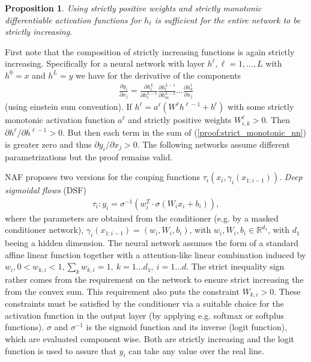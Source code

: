 \documentclass[12pt,a4paper]{article}
\newtheorem{proposition}{Proposition}
\begin{document}
\begin{proposition}{\cite{huang_2018_neural_autoregressive_flows}}
	Using strictly positive weights and strictly
	monotonic differentiable activation functions for $h_\ell$ is sufficient for the
	entire network to be strictly increasing.
\end{proposition}
First note that the composition of strictly increasing functions is again strictly increasing. Specifically for a neural network with layer $h^\ell, \ell=1,\dots, L$ with  $h^0=x$ and $h^L=y$ we have for the derivative of the components
\begin{align} \label{proof:strict_monotonic_nn}
	\frac{\partial y_i}{\partial x_j} = \frac{\partial h^{L}_i}{\partial h^{L-1}_l} 
	\frac{\partial h^{L-1}_l}{\partial h^{L-2}_m}  \dots 
	\frac{\partial h^1_k}{\partial x_j}
\end{align}
(using einstein sum convention). If $h^\ell = a^\ell(W^\ell h^{\ell -1} + b^\ell)$ with some strictly monotonic activation function $a^\ell$ and strictly positive weights $W^\ell_{i,k} > 0$. Then $\partial h^\ell  / \partial h ^{\ell -1} > 0$. But then each term in the sum of (\ref{proof:strict_monotonic_nn}) is greater zero
and thus  $\partial y_i/\partial x_j > 0$. The following networks assume different parametrizations but the proof remains valid.

NAF proposes two versions for the couping functions $\tau_i(x_i, \gamma_i(x_{1:i-1}))$. \textit{Deep sigmoidal flows} (DSF)
\begin{align} \label{eq:dsf}
	\tau_i: y_i = \sigma^{-1}\left(w_i^T \cdot \sigma \left(W_i  x_i + b_i\right)   \right),
\end{align}
where the parameters are obtained from the conditioner (e.g. by a masked conditioner network), $\gamma_i(x_{1:i-1}) = (w_i, W_i, b_i)$, with $w_i, W_i, b_i \in \mathbb{R}^{d_1}$, with $d_1$ beeing a hidden dimension.
The neural network assumes the form of a standard affine linear function together with a attention-like \cite{bahdanau_2016_attention} linear combination induced by $w_i, 0<w_{k, i}<1, \sum_k w_{k, i}=1, ~ k=1 \dots d_1, ~i=1\dots d$. The strict inequality sign rather comes from the requirement on the network to ensure strict increasing the from the convex sum. This requirement also puts the constraint $W_{k, i} > 0$. 
These constraints must be satisfied by the conditioner via a suitable choice for the activation function in the output layer (by applying e.g. softmax or softplus functions).
$\sigma$ and $\sigma^{-1}$ is the sigmoid function and its inverse (logit function), which are evaluated component wise. Both are strictly increasing and the logit function is used to assure that $y_i$ can take any value over the real line. 
\end{document}
